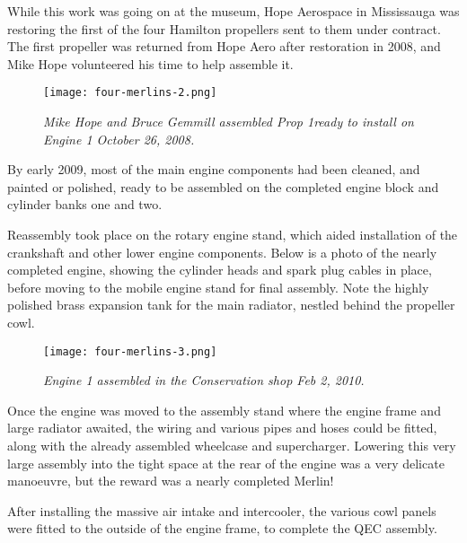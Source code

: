 While this work was going on at the museum, Hope Aerospace in Mississauga was
restoring the first of the four Hamilton propellers sent to them under
contract. The first propeller was returned from Hope Aero after restoration in
2008, and Mike Hope volunteered his time to help assemble it.   

\begin{figure}[htbp]
   \vspace{2em}
   \centering
   \texttt{[image: four-merlins-2.png]}
   \caption*{\small \em  Mike Hope and Bruce Gemmill assembled Prop 1ready to
install on Engine 1 October 26, 2008.}
   \label{fig:tim}
\end{figure}

By early 2009, most of the main engine components had been cleaned, and painted
or polished, ready to be assembled on the completed engine block and cylinder
banks one and two.

Reassembly took place on the rotary engine stand, which aided installation of
the crankshaft and other lower engine components. Below is a photo of the
nearly completed engine, showing the cylinder heads and spark plug cables in
place, before moving to the mobile engine stand for final assembly. Note the
highly polished brass expansion tank for the main radiator, nestled behind the
propeller cowl.

\begin{figure}[htbp]
   \vspace{2em}
   \centering
   \texttt{[image: four-merlins-3.png]}
   \caption*{\small \em Engine 1 assembled in the Conservation shop Feb 2,
2010.}
   \label{fig:tim}
\end{figure}

Once the engine was moved to the assembly stand where the engine frame and
large radiator awaited, the wiring and various pipes and hoses could be fitted,
along with the already assembled wheelcase and supercharger. Lowering this very
large assembly into the tight space at the rear of the engine was a very
delicate manoeuvre, but the reward was a nearly completed Merlin!

After installing the massive air intake and intercooler, the various cowl
panels were fitted to the outside of the engine frame, to complete the QEC
assembly.

